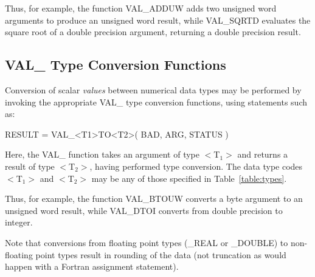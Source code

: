 \documentclass[11pt,nolof]{starlink}
\providecommand{\name}[1]{#1}
\begin{document}
Thus, for example, the function \name{VAL\_ADDUW} adds two unsigned word
arguments to produce an unsigned word result, while \name{VAL\_SQRTD}
evaluates the square root of a double precision argument, returning a double
precision result.

\subsection{\name{VAL\_} Type Conversion Functions}

Conversion of scalar \emph{values} between numerical data types may be
performed by invoking the appropriate \name{VAL\_} type conversion functions,
using statements such as:

\begin{terminalv}
RESULT = VAL_<T1>TO<T2>( BAD, ARG, STATUS )
\end{terminalv}

Here, the \name{VAL\_} function takes an argument of type \name{$<$T$_{1}>$}
and returns a result of type \name{$<$T$_{2}>$}, having performed type
conversion.
The data type codes \name{$<$T$_{1}>$} and \name{$<$T$_{2}>$} may be any of
those specified in Table~\ref{table:types}.

Thus, for example, the function \name{VAL\_BTOUW} converts a byte argument
to an unsigned word result, while \name{VAL\_DTOI} converts from double
precision to integer.

Note that conversions from floating point types (\name{\_REAL} or
\name{\_DOUBLE}) to non-floating point types result in rounding of the data
(not truncation as would happen with a Fortran assignment statement).
\end{document}
